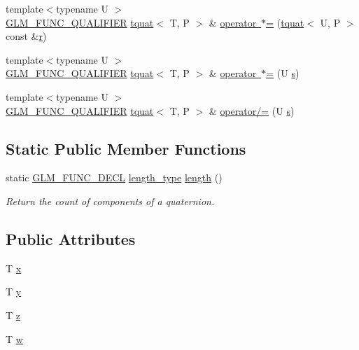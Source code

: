 \begin{DoxyCompactItemize}
\item 
{\footnotesize template$<$typename U $>$ }\\\mbox{\hyperlink{setup_8hpp_a33fdea6f91c5f834105f7415e2a64407}{G\+L\+M\+\_\+\+F\+U\+N\+C\+\_\+\+Q\+U\+A\+L\+I\+F\+I\+ER}} \mbox{\hyperlink{structglm_1_1tquat}{tquat}}$<$ T, P $>$ \& \mbox{\hyperlink{structglm_1_1tquat_a6f861169dd4185c0b4b53185b6d92677}{operator $\ast$=}} (\mbox{\hyperlink{structglm_1_1tquat}{tquat}}$<$ U, P $>$ const \&\mbox{\hyperlink{glad_8h_abe08814c2f72843fde4d8df41440d5a0}{r}})
\item 
{\footnotesize template$<$typename U $>$ }\\\mbox{\hyperlink{setup_8hpp_a33fdea6f91c5f834105f7415e2a64407}{G\+L\+M\+\_\+\+F\+U\+N\+C\+\_\+\+Q\+U\+A\+L\+I\+F\+I\+ER}} \mbox{\hyperlink{structglm_1_1tquat}{tquat}}$<$ T, P $>$ \& \mbox{\hyperlink{structglm_1_1tquat_afa74e0952295c1870335553fe436b047}{operator $\ast$=}} (U \mbox{\hyperlink{glad_8h_af1b1d5edfea6a34daee7389b1b5810ad}{s}})
\item 
{\footnotesize template$<$typename U $>$ }\\\mbox{\hyperlink{setup_8hpp_a33fdea6f91c5f834105f7415e2a64407}{G\+L\+M\+\_\+\+F\+U\+N\+C\+\_\+\+Q\+U\+A\+L\+I\+F\+I\+ER}} \mbox{\hyperlink{structglm_1_1tquat}{tquat}}$<$ T, P $>$ \& \mbox{\hyperlink{structglm_1_1tquat_a320e96991b6611e14172310e42f72d5f}{operator/=}} (U \mbox{\hyperlink{glad_8h_af1b1d5edfea6a34daee7389b1b5810ad}{s}})
\end{DoxyCompactItemize}
\subsection*{Static Public Member Functions}
\begin{DoxyCompactItemize}
\item 
static \mbox{\hyperlink{setup_8hpp_ab2d052de21a70539923e9bcbf6e83a51}{G\+L\+M\+\_\+\+F\+U\+N\+C\+\_\+\+D\+E\+CL}} \mbox{\hyperlink{structglm_1_1tquat_ab3ef67a20d129dcb01f042042218ba17}{length\+\_\+type}} \mbox{\hyperlink{structglm_1_1tquat_a0580a3d29f748f91ae9f1410e589b925}{length}} ()
\begin{DoxyCompactList}\small\item\em Return the count of components of a quaternion. \end{DoxyCompactList}\end{DoxyCompactItemize}
\subsection*{Public Attributes}
\begin{DoxyCompactItemize}
\item 
T \mbox{\hyperlink{structglm_1_1tquat_a4e7a21e85428fa8d10e613f109185f28}{x}}
\item 
T \mbox{\hyperlink{structglm_1_1tquat_a06d5c5fb3b08ec993fb4dd74b22fc011}{y}}
\item 
T \mbox{\hyperlink{structglm_1_1tquat_a1b28678ac0e0b3ac2537059754df9fdf}{z}}
\item 
T \mbox{\hyperlink{structglm_1_1tquat_a91055a4c17113bd3f357ffd8595d8ac0}{w}}
\end{DoxyCompactItemize}


